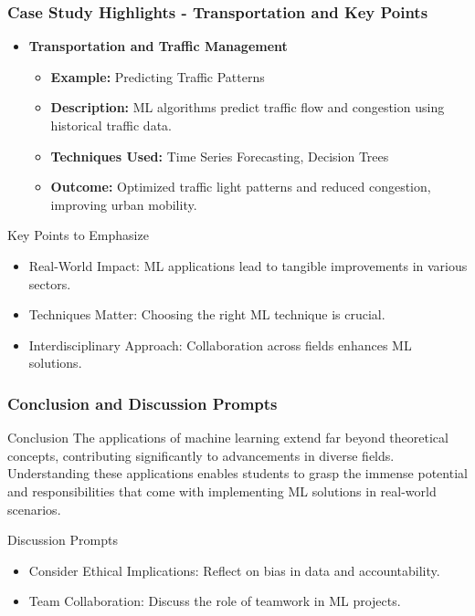 \documentclass[aspectratio=169]{beamer}
\begin{document}
\begin{frame}[fragile]
    \frametitle{Case Study Highlights - Transportation and Key Points}
    \begin{itemize}
        \item \textbf{Transportation and Traffic Management}
        \begin{itemize}
            \item \textbf{Example:} Predicting Traffic Patterns
            \item \textbf{Description:} ML algorithms predict traffic flow and congestion using historical traffic data.
            \item \textbf{Techniques Used:} Time Series Forecasting, Decision Trees
            \item \textbf{Outcome:} Optimized traffic light patterns and reduced congestion, improving urban mobility.
        \end{itemize}
    \end{itemize}
    
    \begin{block}{Key Points to Emphasize}
        \begin{itemize}
            \item Real-World Impact: ML applications lead to tangible improvements in various sectors.
            \item Techniques Matter: Choosing the right ML technique is crucial.
            \item Interdisciplinary Approach: Collaboration across fields enhances ML solutions.
        \end{itemize}
    \end{block}
\end{frame}

\begin{frame}[fragile]
    \frametitle{Conclusion and Discussion Prompts}
    \begin{block}{Conclusion}
        The applications of machine learning extend far beyond theoretical concepts, contributing significantly to advancements in diverse fields. Understanding these applications enables students to grasp the immense potential and responsibilities that come with implementing ML solutions in real-world scenarios.
    \end{block}
    
    \begin{block}{Discussion Prompts}
        \begin{itemize}
            \item Consider Ethical Implications: Reflect on bias in data and accountability.
            \item Team Collaboration: Discuss the role of teamwork in ML projects.
        \end{itemize}
    \end{block}
\end{frame}
\end{document}
